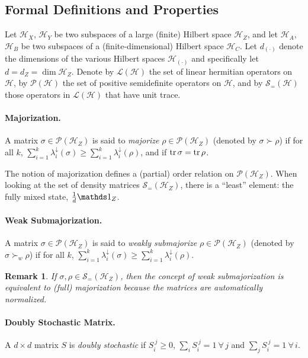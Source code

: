 \documentclass[11pt,a4paper]{article}
\theoremstyle{plain}
\newtheorem*{remark*}{Remark}
\def\Hs{\mathscr{H}}%
\newcommand{\lD}{\lambda^\downarrow}
\newcommand{\LOps}{\mathscr{L}}
\newcommand{\POps}{\mathscr{P}}
\newcommand{\DOps}{\mathscr{S}_=}
\begin{document}
\subsection{Formal Definitions and Properties}

Let $\Hs_X$, $\Hs_Y$ be two subspaces of a large (finite) Hilbert space $\Hs_Z$, and let
$\Hs_A$, $\Hs_B$ be two subspaces of a (finite-dimensional) Hilbert space $\Hs_C$. Let $d_{(\cdot)}$ denote
 the dimensions of the various Hilbert
spaces $\Hs_{(\cdot)}$ and specifically let $d=d_Z=\dim\Hs_Z$. Denote by $\LOps(\Hs)$ the set of linear
hermitian operators on $\Hs$, by $\POps(\Hs)$ the set of positive semidefinite operators on $\Hs$, and
by $\DOps(\Hs)$ those operators in $\LOps(\Hs)$ that have unit trace.

\paragraph{Majorization.} A matrix $\sigma\in\POps(\Hs_Z)$ is said to {\em majorize} $\rho\in\POps(\Hs_Z)$
(denoted by $\sigma\succ\rho$) if for all $k$, $\sum_{i=1}^k \lD_i(\sigma) \geqslant \sum_{i=1}^k \lD_i(\rho)$,
and if $\operatorname{tr}\sigma=\operatorname{tr}\rho$.

The notion of majorization defines a (partial) order relation on $\POps(\Hs_Z)$. When looking at the
set of density matrices $\DOps(\Hs_Z)$, there is a ``least'' element: the fully mixed state,
$\frac{1}{d}\Ident_Z$.

\paragraph{Weak Submajorization.} A matrix $\sigma\in\POps(\Hs_Z)$ is said to {\em weakly submajorize}
$\rho\in\POps(\Hs_Z)$ (denoted by $\sigma\succ_w\rho$) if for all $k$,
$\sum_{i=1}^k \lD_i(\sigma) \geqslant \sum_{i=1}^k \lD_i(\rho)$.

\begin{remark*}
  If $\sigma,\rho\in\DOps(\Hs_Z)$, then the concept of weak submajorization is equivalent to (full)
  majorization because the matrices are automatically normalized.
\end{remark*}

\paragraph{Doubly Stochastic Matrix.} A $d\times d$ matrix $S$ is {\em doubly stochastic} if
$S_i^{~j}\geqslant 0$, $\sum_i S_i^{~j} = 1~\forall\,j$ and $\sum_j S_i^{~j} = 1~\forall\,i$.
\end{document}
